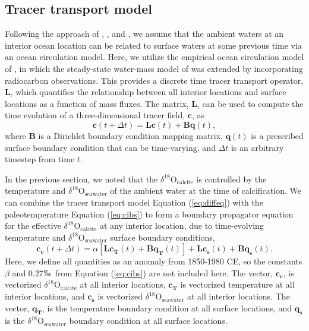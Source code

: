 \documentclass[draft]{agujournal2019}
\begin{document}
\subsection{Tracer transport model \label{sec:prop}}
Following the approach of , , and , we assume that the ambient waters at an interior ocean location can be related to surface waters at some previous time via an ocean circulation model. Here, we utilize the empirical ocean circulation model of , in which the steady-state water-mass model of  was extended by incorporating radiocarbon observations. This provides a discrete time tracer transport operator, $\mathbf{L}$, which quantifies the relationship between all interior locations and surface locations as a function of mass fluxes. The matrix, $\mathbf{L}$, can be used to compute the time evolution of a three-dimensional tracer field, $\mathbf{c}$, as
\begin{equation}
\label{eq:diffeq}
\mathbf{c}(t + \Delta t) = \mathbf{Lc}(t) + \mathbf{Bq}(t), 
\end{equation}
where $\mathbf{B}$ is a Dirichlet boundary condition mapping matrix, $\mathbf{q}(t)$ is a prescribed surface boundary condition that can be time-varying, and $\Delta t$ is an arbitrary timestep from time $t$.

In the previous section, we noted that the $\delta^{18}\mathrm{O}_{\mathrm{calcite}}$ is controlled by the temperature and $\delta^{18}\mathrm{O}_{\mathrm{seawater}}$ of the ambient water at the time of calcification. We can combine the tracer transport model Equation (\ref{eq:diffeq}) with the paleotemperature Equation (\ref{eq:cibs}) to form a boundary propagator equation for the effective $\delta^{18}\mathrm{O}_{\mathrm{calcite}}$ at any interior location, due to time-evolving temperature and $\delta^{18}\mathrm{O}_{\mathrm{seawater}}$ surface boundary conditions,
\begin{equation}
\label{eq:diffeqspec}
\mathbf{c_{c}}(t+\Delta t) = \alpha[\mathbf{L} \mathbf{c_{T}}(t) + \mathbf{B} \mathbf{q_{T}}(t)] + \mathbf{L}\mathbf{c_{s}}(t) + \mathbf{B}\mathbf{q_{s}}(t). 
\end{equation}
Here, we define all quantities as an anomaly from 1850-1980 CE, so the constants $\beta$ and 0.27$\permil$ from Equation (\ref{eq:cibs}) are not included here. The vector, $\mathbf{c_c}$, is vectorized $\delta^{18}\mathrm{O}_{\mathrm{calcite}}$ at all interior locations, $\mathbf{c_{T}}$ is vectorized temperature at all interior locations, and $\mathbf{c_{s}}$ is vectorized $\delta^{18}\mathrm{O}_{\mathrm{seawater}}$ at all interior locations. The vector, $\mathbf{q_{T}}$, is the temperature boundary condition at all surface locations, and $\mathbf{q_{s}}$ is the $\delta^{18}\mathrm{O}_{\mathrm{seawater}}$ boundary condition at all surface locations.
\end{document}
